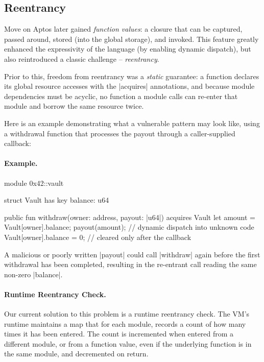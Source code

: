 \subsection{Reentrancy}
\label{sec:reentrancy}

Move on Aptos later gained \emph{function values}: a closure that can be captured, passed around, stored (into the global storage), and invoked.
This feature greatly enhanced the expressivity of the language (by enabling dynamic dispatch), but also reintroduced a classic challenge -- \emph{reentrancy}.

Prior to this, freedom from reentrancy was a \emph{static} guarantee: a function declares its global resource accesses with the |acquires| annotations, 
and because module dependencies must be acyclic, no function a module calls can re-enter that module and borrow the same resource twice.

Here is an example demonstrating what a vulnerable pattern may look like, using a withdrawal function that processes the payout through a caller-supplied
callback:

\paragraph{Example.}
\begin{MoveBox}
module 0x42::vault {
  struct Vault has key { balance: u64 }

  public fun withdraw(owner: address, payout: |u64|) acquires Vault {
    let amount = Vault[owner].balance;
    payout(amount);            // dynamic dispatch into unknown code
    Vault[owner].balance = 0;  // cleared only after the callback
  }
}
\end{MoveBox}

A malicious or poorly written |payout| could call |withdraw| again before the first withdrawal has been completed, resulting in the re-entrant call reading the same non-zero |balance|.

\paragraph{Runtime Reentrancy Check.}
Our current solution to this problem is a runtime reentrancy check. The VM's runtime maintains a map that for each module, records a count of how many times it has been entered.
The count is incremented when entered from a different module, or from a function value, even if the underlying function is in the same module, and decremented on return.

